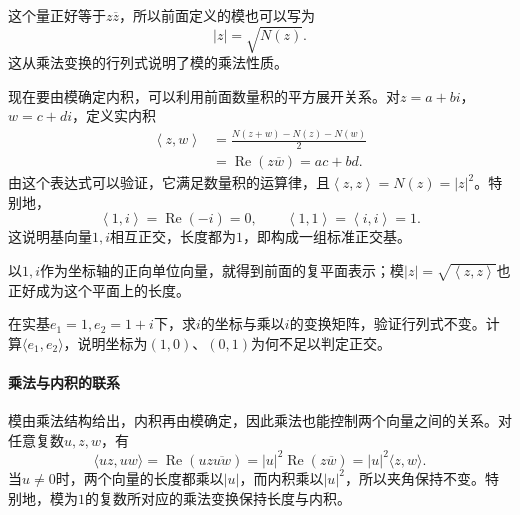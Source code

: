 这个量正好等于\(z \overline{z}\)，所以前面定义的模也可以写为
\begin{equation}
    \left| z \right| = \sqrt{N \left( z \right)} .
\end{equation}
这从乘法变换的行列式说明了模的乘法性质。

现在要由模确定内积，可以利用前面数量积的平方展开关系。对\(z = a + b i\)，\(w = c + d i\)，定义实内积
\begin{equation}
    \begin{aligned}
        \left\langle z , w \right\rangle
        &= \frac{N \left( z + w \right) - N \left( z \right) - N \left( w \right)}{2} \\
        &= \operatorname{Re} \left( z \overline{w} \right) = a c + b d .
    \end{aligned}
\end{equation}
由这个表达式可以验证，它满足数量积的运算律，且\(\left\langle z , z \right\rangle = N \left( z \right) = \left| z \right|^{2}\)。特别地，
\begin{equation}
    \left\langle 1 , i \right\rangle = \operatorname{Re} \left( - i \right) = 0 , \qquad
    \left\langle 1 , 1 \right\rangle = \left\langle i , i \right\rangle = 1 .
\end{equation}
这说明基向量\(1 , i\)相互正交，长度都为\(1\)，即构成一组{\heiti{}标准正交基}。

以\(1 , i\)作为坐标轴的正向单位向量，就得到前面的复平面表示；模\(\left| z \right| = \sqrt{\left\langle z , z \right\rangle}\)也正好成为这个平面上的长度。

\begin{example}
在实基\(e_1=1,e_2=1+i\)下，求\(i\)的坐标与乘以\(i\)的变换矩阵，验证行列式不变。计算\(\langle e_1,e_2\rangle\)，说明坐标为\((1,0)\)、\((0,1)\)为何不足以判定正交。
\end{example}

\paragraph{乘法与内积的联系} \mbox{}

模由乘法结构给出，内积再由模确定，因此乘法也能控制两个向量之间的关系。对任意复数\(u,z,w\)，有
\begin{equation*}
 \langle uz,uw\rangle
 =\operatorname{Re}(uz\overline{uw})
 =|u|^2\operatorname{Re}(z\overline w)
 =|u|^2\langle z,w\rangle.
\end{equation*}
当\(u\ne0\)时，两个向量的长度都乘以\(|u|\)，而内积乘以\(|u|^2\)，所以夹角保持不变。特别地，模为\(1\)的复数所对应的乘法变换保持长度与内积。

